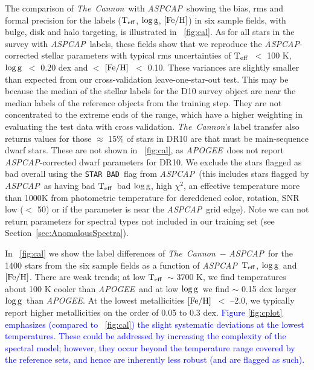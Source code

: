 \documentclass[12pt, preprint]{aastex}
\newcommand{\sectionname}{Section}
\newcommand{\tc}{\textsl{The~Cannon}}
\newcommand{\apogee}{\textsl{APOGEE}}
\newcommand{\aspcap}{\textsl{ASPCAP}}
\newcommand{\badstar}{\texttt{STAR BAD}}
\newcommand{\teff}{\mbox{$\rm T_{eff}$}}
\newcommand{\feh}{\mbox{$\rm [Fe/H]$}}
\newcommand{\logg}{\mbox{$\rm \log g$}}
\begin{document}
The comparison of \tc\ with \aspcap\, showing the bias, rms and formal precision for the labels (\teff , \logg , \feh ) in six sample fields, with bulge, disk and halo targeting, is illustrated in \figurename~\ref{fig:cal}. As for all stars in the survey with \aspcap\ labels, these fields show that we reproduce the \aspcap-corrected stellar parameters with typical rms uncertainties of \teff\ $<$ 100 K, \logg\ $<$ 0.20 dex and $<$ \feh\ $<$ 0.10. These variances are slightly smaller than expected from our cross-validation leave-one-star-out test. This may be because the median of the stellar labels for the D10 survey object are near the median labels of the reference objects from the training step. 
They are not concentrated to the extreme ends of the range, which have a higher weighting in evaluating the test data with cross validation. 
 \tc 's label transfer also returns values for those $\approx$ 15\% of stars in DR10 are that must be main-sequence dwarf stars. 
These are not shown in \figurename~\ref{fig:cal}, as \apogee\ does not report \aspcap-corrected dwarf parameters for DR10. 
We exclude the stars flagged as bad overall  using the \badstar\ flag from \aspcap\ (this includes stars flagged by \aspcap\ as having bad \teff\, bad \logg, high $\chi^2$, an effective temperature more than 1000K from photometric temperature for dereddened color, rotation, SNR low ($<$ 50) or if the parameter is near the \aspcap\ grid edge).  Note we can not return parameters for spectral types not included in our training set (see \sectionname~\ref{sec:AnomalousSpectra}). 

In \figurename~\ref{fig:cal} we show the label differences of \tc\ $-$ \aspcap\ for the 1400 stars from the six sample fields as a function of \aspcap\ \teff, \logg\ and \feh. There are weak trends; at low \teff\ $\sim$ 3700 K, we find temperatures about 100 K cooler than \apogee\ and at low \logg\ we find $\sim$ 0.15 dex larger \logg\ than \apogee. At the lowest metallicities \feh\ $<$ --2.0, we typically report higher metallicities on the order of 0.05 to 0.3 dex. \textcolor{blue}{Figure \ref{fig:cplot} emphasizes (compared to
 \figurename~\ref{fig:cal}) the slight systematic deviations at the lowest temperatures. These could be addressed by increasing the complexity of the spectral model; however, they occur beyond the temperature range covered by the reference sets, and hence are inherently less robust (and are flagged as such).}
\end{document}
